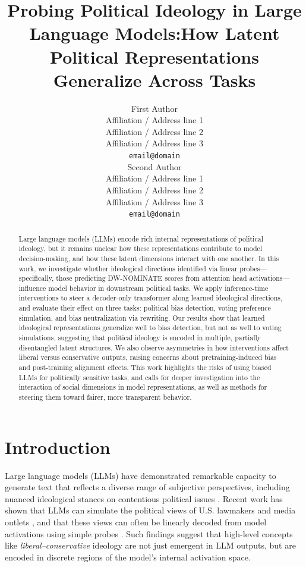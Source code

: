 \documentclass[11pt]{article}
\title{Probing Political Ideology in Large Language Models:\break How Latent Political Representations Generalize Across Tasks}
\author{First Author \\
  Affiliation / Address line 1 \\
  Affiliation / Address line 2 \\
  Affiliation / Address line 3 \\
  \texttt{email@domain} \\\And
  Second Author \\
  Affiliation / Address line 1 \\
  Affiliation / Address line 2 \\
  Affiliation / Address line 3 \\
  \texttt{email@domain} \\}
\begin{document}
\maketitle
\begin{abstract}
Large language models (LLMs) encode rich internal representations of political ideology, but it remains unclear how these representations contribute to model decision-making, and how these latent dimensions interact with one another. In this work, we investigate whether ideological directions identified via linear probes—specifically, those predicting DW-NOMINATE scores from attention head activations—influence model behavior in downstream political tasks. We apply inference-time interventions to steer a decoder-only transformer along learned ideological directions, and evaluate their effect on three tasks: political bias detection, voting preference simulation, and bias neutralization via rewriting. Our results show that learned ideological representations generalize well to bias detection, but not as well to voting simulations, suggesting that political ideology is encoded in multiple, partially disentangled latent structures. We also observe asymmetries in how interventions affect liberal versus conservative outputs, raising concerns about pretraining-induced bias and post-training alignment effects. This work highlights the risks of using biased LLMs for politically sensitive tasks, and calls for deeper investigation into the interaction of social dimensions in model representations, as well as methods for steering them toward fairer, more transparent behavior.
\end{abstract}

\section{Introduction}

Large language models (LLMs) have demonstrated remarkable capacity to generate text that reflects a diverse range of subjective perspectives, including nuanced ideological stances on contentious political issues \citep{argyleOutOneMany2023, kimLinearRepresentationsPolitical2025, wuLargeLanguageModels2023a, lemensPositioningPoliticalTexts2025}. Recent work has shown that LLMs can simulate the political views of U.S. lawmakers and media outlets \citep{pmlr-v202-santurkar23a, bernardelleMappingInfluencingPolitical2024}, and that these views can often be linearly decoded from model activations using simple probes \citep{kimLinearRepresentationsPolitical2025, parkLinearRepresentationHypothesis2024}. Such findings suggest that high-level concepts like \textit{liberal--conservative} ideology are not just emergent in LLM outputs, but are encoded in discrete regions of the model’s internal activation space.
\end{document}
